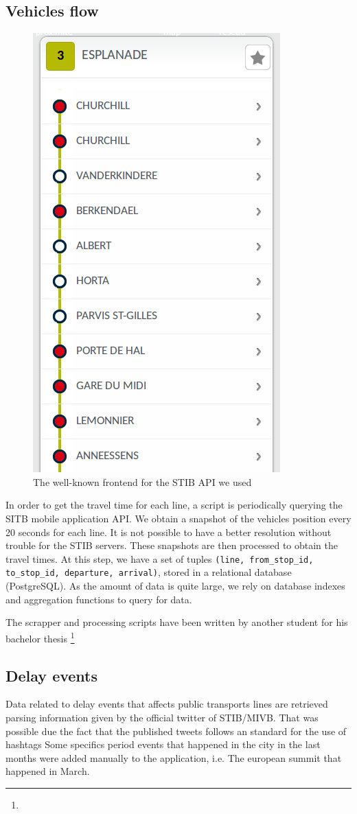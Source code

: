 \documentclass[12pt]{article}%
\begin{document}
\subsection{Vehicles flow}
\begin{figure}[H]
    \center
    \includegraphics[width=.3\textwidth]{stibmobile.png}
    \caption{\label{fig:stibmobile-app} The well-known frontend for the STIB API we used}
\end{figure}

In order to get the travel time for each line, a script is periodically querying the SITB mobile application API. We obtain a snapshot of the vehicles position every 20 seconds for each line. It is not possible to have a better resolution without trouble for the STIB servers. These snapshots are then processed to obtain the travel times. At this step, we have a set of tuples \texttt{(line, from\_stop\_id, to\_stop\_id, departure, arrival)}, stored in a relational database (PostgreSQL). As the amount of data is quite large, we rely on database indexes and aggregation functions to query for data.

The scrapper and processing scripts have been written by another student for his bachelor thesis \footnote{}

\subsection{Delay events}
Data related to delay events that affects public transports lines are retrieved parsing information given by the official twitter of STIB/MIVB. %
That was possible due the fact that the published tweets follows an standard for the use of hashtags
Some specifics period events that happened in the city in the last months were added manually to the application, i.e. The european summit that happened in March.                       
                       
\end{document}

